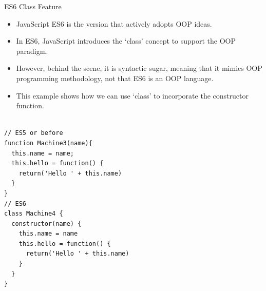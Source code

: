 \begin{frame}[fragile]{ES6 Class Feature}

\begin{itemize}
	\item JavaScript ES6 is the version that actively adopts OOP ideas. 
	\item In ES6, JavaScript introduces the `class' concept to support the OOP paradigm. 
	\item However, behind the scene, it is syntactic sugar, meaning that it mimics OOP programming methodology, not that ES6 is an OOP language. 
\end{itemize}


\end{frame}

\begin{frame}[fragile]{}

\begin{itemize}
	\item This example shows how we can use `class' to incorporate the constructor function. 
\end{itemize}

\begin{Code}{}%
\begin{lstlisting}[firstnumber=1, label=glabels, xleftmargin=0pt, basicstyle=\tiny]% 

// ES5 or before
function Machine3(name){
  this.name = name;
  this.hello = function() {
    return('Hello ' + this.name)
  }
}
// ES6
class Machine4 {
  constructor(name) {
    this.name = name
    this.hello = function() {
      return('Hello ' + this.name)
    }
  }
}
\end{lstlisting}%
\end{Code}%

\end{frame}

